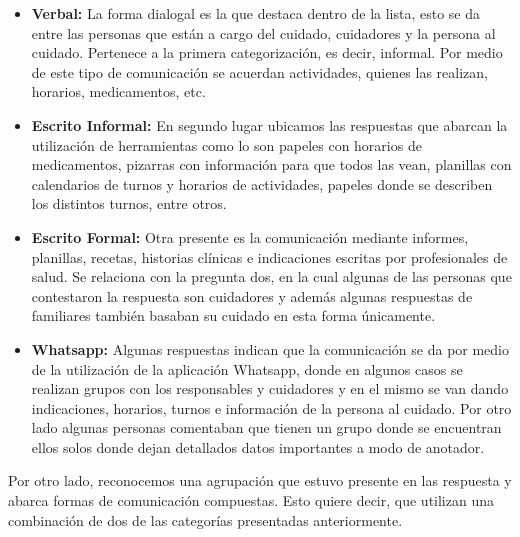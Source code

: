 \documentclass[a4paper,12pt]{article}
\begin{document}
    \begin{itemize}
        \item \textbf{Verbal:} La forma dialogal es la que destaca dentro de la lista, esto se da entre las personas que están a cargo del cuidado, cuidadores y la persona al cuidado. Pertenece a la primera categorización, es decir, informal. Por medio de este tipo de comunicación se acuerdan actividades, quienes las realizan, horarios, medicamentos, etc.
        \item \textbf{Escrito Informal:} En segundo lugar ubicamos las respuestas que abarcan la utilización de herramientas como lo son papeles con horarios de medicamentos, pizarras con información para que todos las vean, planillas con calendarios de turnos y horarios de actividades, papeles donde se describen los distintos turnos, entre otros.
        \item \textbf{Escrito Formal:} Otra presente es la comunicación mediante informes, planillas, recetas, historias clínicas e indicaciones escritas por profesionales de salud. Se relaciona con la pregunta dos, en la cual algunas de las personas que contestaron la respuesta son cuidadores y además algunas respuestas de familiares también basaban su cuidado en esta forma únicamente.
        \item \textbf{Whatsapp:} Algunas respuestas indican que la comunicación se da por medio de la utilización de la aplicación Whatsapp, donde en algunos casos se realizan grupos con los responsables y cuidadores y en el mismo se van dando indicaciones, horarios, turnos e información de la persona al cuidado. Por otro lado algunas personas comentaban que tienen un grupo donde se encuentran ellos solos donde dejan detallados datos importantes a modo de anotador.
    \end{itemize}
    Por otro lado, reconocemos una agrupación que estuvo presente en las respuesta y abarca formas de comunicación compuestas. Esto quiere decir, que utilizan una combinación de dos de las categorías presentadas anteriormente.
\end{document}
